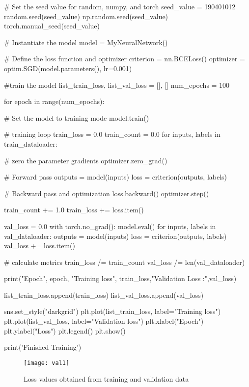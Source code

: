 \documentclass[11pt]{article}
\begin{document}
\begin{python}

# Set the seed value for random, numpy, and torch
seed_value = 190401012
random.seed(seed_value)
np.random.seed(seed_value)
torch.manual_seed(seed_value)


# Instantiate the model
model = MyNeuralNetwork()

# Define the loss function and optimizer
criterion = nn.BCELoss()
optimizer = optim.SGD(model.parameters(), lr=0.001)

#train the model
list_train_loss, list_val_loss = [], []
num_epochs = 100

for epoch in range(num_epochs):

    # Set the model to training mode
    model.train()

    # training loop
    train_loss = 0.0
    train_count = 0.0
    for inputs, labels in train_dataloader:

        # zero the parameter gradients
        optimizer.zero_grad()
        
        # Forward pass
        outputs = model(inputs)
        loss = criterion(outputs, labels)
        
        # Backward pass and optimization
        loss.backward()
        optimizer.step()

        train_count += 1.0
        train_loss += loss.item()


    val_loss = 0.0
    with torch.no_grad():
        model.eval()
        for inputs, labels in val_dataloader:
            outputs = model(inputs)
            loss = criterion(outputs, labels)
            val_loss += loss.item()


    # calculate metrics
    train_loss /= train_count
    val_loss /= len(val_dataloader)

    print("Epoch", epoch, "Training loss", train_loss,"Validation Loss :",val_loss)

    list_train_loss.append(train_loss)
    list_val_loss.append(val_loss)


sns.set_style("darkgrid")
plt.plot(list_train_loss, label="Training loss")
plt.plot(list_val_loss, label="Validation loss")
plt.xlabel("Epoch")
plt.ylabel("Loss")
plt.legend()
plt.show()

print('Finished Training')
\end{python}

\begin{figure}[ht!]
    \centering
    \texttt{[image: val1]}
    \caption{Loss values obtained from training and validation data}
    \label{fig:loss table}
\end{figure}
\clearpage
\end{document}
